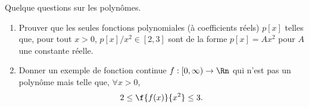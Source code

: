 
\begin{exercice}\label{exo0033}

Quelque questions sur les polynômes.
\begin{enumerate}
\item Prouver que les seules fonctions polynomiales (à coefficients réels) $p[x]$ telles que, pour tout $x>0$, $p[x]/ x^2\in[2,3]$ sont de la forme $p[x] = Ax^2$ pour $A$ une constante réelle.
\item Donner un exemple de fonction continue $f:[0,\infty)\rightarrow \Rn$ qui n'est pas un polynôme mais telle que, $\forall x>0$,
\[
	2\leq\f{f(x)}{x^2}\leq3.
\] 
\end{enumerate}

\end{exercice}
